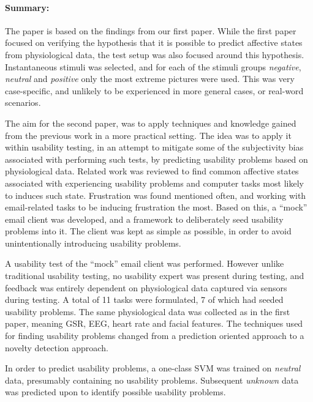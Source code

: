 \paragraph{Summary:}
The paper is based on the findings from our first paper. While the first paper focused on verifying the hypothesis that
it is possible to predict affective states from physiological data, the test setup was also focused around this
hypothesis.  Instantaneous stimuli was selected, and for each of the stimuli groups \textit{negative}, \textit{neutral}
and \textit{positive} only the most extreme pictures were used.  This was very case-specific, and unlikely to be
experienced in more general cases, or real-word scenarios.

The aim for the second paper, was to apply techniques and knowledge gained from the previous work in a more practical
setting. The idea was to apply it within usability testing, in an attempt to mitigate some of the subjectivity bias
associated with performing such tests, by predicting usability problems based on physiological data. Related work was
reviewed to find common affective states associated with experiencing usability problems and computer tasks most likely
to induces such state. Frustration was found mentioned often, and working with email-related tasks to be inducing
frustration the most. Based on this, a ``mock'' email client was developed, and a framework to deliberately seed
usability problems into it. The client was kept as simple as possible, in order to avoid unintentionally introducing
usability problems.

A usability test of the ``mock'' email client was performed. However unlike traditional usability testing, no usability
expert was present during testing, and feedback was entirely dependent on physiological data captured via sensors during
testing.  A total of 11 tasks were formulated, 7 of which had seeded usability problems.  The same physiological data
was collected as in the first paper, meaning GSR, EEG, heart rate and facial features.  The techniques used for finding
usability problems changed from a prediction oriented approach to a novelty detection approach.

In order to predict usability problems, a one-class SVM was trained on \textit{neutral} data, presumably containing no
usability problems. Subsequent \textit{unknown} data was predicted upon to identify possible usability problems.


